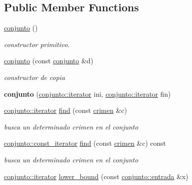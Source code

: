 \subsection*{Public Member Functions}
\begin{DoxyCompactItemize}
\item 
\hyperlink{classconjunto_ab634a250097d154d69a13bf8bde9fec7}{conjunto} ()
\begin{DoxyCompactList}\small\item\em constructor primitivo. \end{DoxyCompactList}\item 
\hyperlink{classconjunto_a09f663eb46bbb383eac55d494e79e6c1}{conjunto} (const \hyperlink{classconjunto}{conjunto} \&d)
\begin{DoxyCompactList}\small\item\em constructor de copia \end{DoxyCompactList}\item 
\hypertarget{classconjunto_a94c56d72b002cf9712a379013d415927}{}{\bfseries conjunto} (\hyperlink{classconjunto_1_1iterator}{conjunto\+::iterator} ini, \hyperlink{classconjunto_1_1iterator}{conjunto\+::iterator} fin)\label{classconjunto_a94c56d72b002cf9712a379013d415927}

\item 
\hyperlink{classconjunto_1_1iterator}{conjunto\+::iterator} \hyperlink{classconjunto_a72ee85a4309acdd8274392fc4a765de4}{find} (const \hyperlink{classcrimen}{crimen} \&c)
\begin{DoxyCompactList}\small\item\em busca un determinado crimen en el conjunto \end{DoxyCompactList}\item 
\hyperlink{classconjunto_1_1const__iterator}{conjunto\+::const\+\_\+iterator} \hyperlink{classconjunto_adc065d4751136dbf69b7b74bc7ca0684}{find} (const \hyperlink{classcrimen}{crimen} \&c) const 
\begin{DoxyCompactList}\small\item\em busca un determinado crimen en el conjunto \end{DoxyCompactList}\item 
\hypertarget{classconjunto_ae977b1e0cc74f2caa0fe23e2f42faef4}{}\hyperlink{classconjunto_1_1iterator}{conjunto\+::iterator} \hyperlink{classconjunto_ae977b1e0cc74f2caa0fe23e2f42faef4}{lower\+\_\+bound} (const \hyperlink{classconjunto_a7630ace7cb17bcec07daf5804f1a0780}{conjunto\+::entrada} \&x)\label{classconjunto_ae977b1e0cc74f2caa0fe23e2f42faef4}


\end{DoxyCompactItemize}

